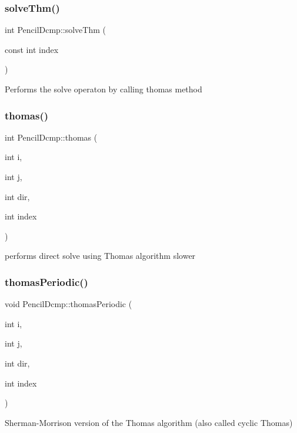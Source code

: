 \subsubsection{\texorpdfstring{solve\+Thm()}{solveThm()}}
{\footnotesize\ttfamily int Pencil\+Dcmp\+::solve\+Thm (\begin{DoxyParamCaption}\item[{const int}]{index }\end{DoxyParamCaption})}

Performs the solve operaton by calling thomas method \mbox{\label{classPencilDcmp_a536eab196adc27ccc36fa51dccf5606f}} 
\subsubsection{\texorpdfstring{thomas()}{thomas()}}
{\footnotesize\ttfamily int Pencil\+Dcmp\+::thomas (\begin{DoxyParamCaption}\item[{int}]{i,  }\item[{int}]{j,  }\item[{int}]{dir,  }\item[{int}]{index }\end{DoxyParamCaption})}

performs direct solve using Thomas algorithm slower \mbox{\label{classPencilDcmp_a7afb77ba481af376247adf69b93d318c}} 
\subsubsection{\texorpdfstring{thomas\+Periodic()}{thomasPeriodic()}}
{\footnotesize\ttfamily void Pencil\+Dcmp\+::thomas\+Periodic (\begin{DoxyParamCaption}\item[{int}]{i,  }\item[{int}]{j,  }\item[{int}]{dir,  }\item[{int}]{index }\end{DoxyParamCaption})}

Sherman-\/\+Morrison version of the Thomas algorithm (also called cyclic Thomas) \mbox{\label{classPencilDcmp_a2146f493283ffa68e46648205c9b6ab2}} 
